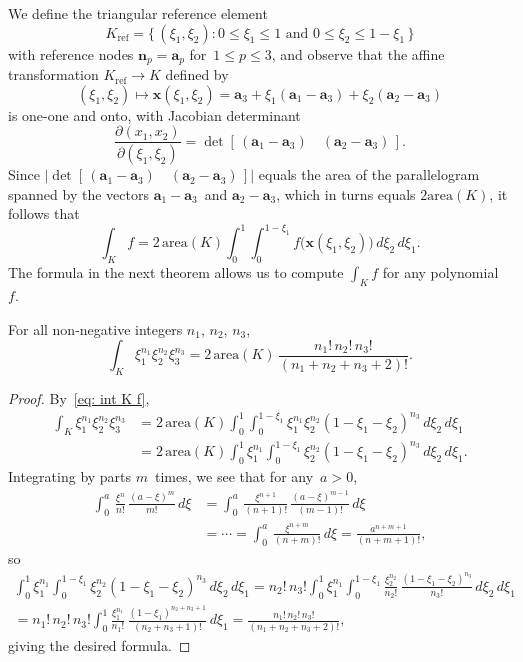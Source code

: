 We define the triangular reference element
\[
K_{\mathrm{ref}}=\{\,(\xi_1,\xi_2):
    \text{$0\le\xi_1\le1$ and $0\le\xi_2\le 1-\xi_1$}\,\}
\]
with reference nodes $\boldsymbol{n}_p=\boldsymbol{a}_p$ for~$1\le p\le 3$,
and observe that the affine transformation $K_{\mathrm{ref}}\to K$ defined by
\[
(\xi_1,\xi_2)\mapsto\boldsymbol{x}(\xi_1,\xi_2)=\boldsymbol{a}_3
    +\xi_1(\boldsymbol{a}_1-\boldsymbol{a}_3)
    +\xi_2(\boldsymbol{a}_2-\boldsymbol{a}_3)
\]
is one-one and onto, with Jacobian determinant
\[
\frac{\partial(x_1,x_2)}{\partial(\xi_1,\xi_2)}
    =\det[\,(\boldsymbol{a}_1-\boldsymbol{a}_3)\quad
            (\boldsymbol{a}_2-\boldsymbol{a}_3)\,].
\]
Since $\bigl|\det[\,(\boldsymbol{a}_1-\boldsymbol{a}_3)\quad
(\boldsymbol{a}_2-\boldsymbol{a}_3)\,]\bigr|$ equals the area of the 
parallelogram spanned by the vectors $\boldsymbol{a}_1-\boldsymbol{a}_3$~and 
$\boldsymbol{a}_2-\boldsymbol{a}_3$, which in turns equals $2\mathrm{area}(K)$, 
it follows that
\begin{equation}\label{eq: int K f}
\int_Kf=2\,\mathrm{area}(K)\int_0^1\int_0^{1-\xi_1}
    f\bigl(\boldsymbol{x}(\xi_1,\xi_2)\bigr)\,d\xi_2\,d\xi_1.
\end{equation}
The formula in the next theorem allows us to compute $\int_Kf$ for any 
polynomial~$f$.

\begin{theorem}\label{thm: int xi}
For all non-negative integers $n_1$, $n_2$, $n_3$,
\[
\int_K\xi_1^{n_1}\xi_2^{n_2}\xi_3^{n_3}=2\,\mathrm{area}(K)\,
    \frac{n_1!\,n_2!\,n_3!}{(n_1+n_2+n_3+2)!}.
\]
\end{theorem}
\begin{proof}
By~\eqref{eq: int K f},
\begin{align*}
\int_K\xi_1^{n_1}\xi_2^{n_2}\xi_3^{n_3}&=2\,\mathrm{area}(K)
    \int_0^1\int_0^{1-\xi_1}\xi_1^{n_1}\xi_2^{n_2}(1-\xi_1-\xi_2)^{n_3}
        \,d\xi_2\,d\xi_1\\
    &=2\,\mathrm{area}(K)
    \int_0^1\xi_1^{n_1}\int_0^{1-\xi_1}\xi_2^{n_2}(1-\xi_1-\xi_2)^{n_3}
        \,d\xi_2\,d\xi_1.
\end{align*}
Integrating by parts $m$~times, we see that for any~$a>0$,
\begin{align*}
\int_0^a\,\frac{\xi^n}{n!}\,\frac{(a-\xi)^m}{m!}\,d\xi
&=\int_0^a\,\frac{\xi^{n+1}}{(n+1)!}\,\frac{(a-\xi)^{m-1}}{(m-1)!}\,d\xi\\
&=\cdots
=\int_0^a\,\frac{\xi^{n+m}}{(n+m)!}\,d\xi=\frac{a^{n+m+1}}{(n+m+1)!},
\end{align*}
so
\begin{multline*}
\int_0^1\xi_1^{n_1}\int_0^{1-\xi_1}\xi_2^{n_2}(1-\xi_1-\xi_2)^{n_3}
        \,d\xi_2\,d\xi_1
    =n_2!\,n_3!\int_0^1\xi_1^{n_1}\int_0^{1-\xi_1}
    \frac{\xi_2^{n_2}}{n_2!}\,\frac{(1-\xi_1-\xi_2)^{n_3}}{n_3!}
        \,d\xi_2\,d\xi_1\\
    =n_1!\,n_2!\,n_3!\int_0^1\frac{\xi_1^{n_1}}{n_1!}\,
        \frac{(1-\xi_1)^{n_2+n_3+1}}{(n_2+n_3+1)!}\,d\xi_1
    =\frac{n_1!\,n_2!\,n_3!}{(n_1+n_2+n_3+2)!},
\end{multline*}
giving the desired formula.
\end{proof}

